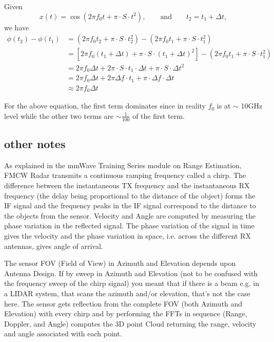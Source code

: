 \documentclass[11pt, oneside]{article}   	%
\begin{document}
Given
$$x(t) = \cos(2\pi f_0 t+ \pi \cdot S\cdot t^2), \qquad \text{and}\qquad t_2 = t_1 + \Delta t,$$
we have
\begin{align*}
\phi(t_2) - \phi(t_1) &= (2\pi f_0 t_2 + \pi\cdot S\cdot t_2^2) - (2\pi f_0 t_1 + \pi\cdot S\cdot t_1^2) \\
& = \left[2\pi f_0 (t_1+\Delta t) + \pi\cdot S\cdot (t_1 + \Delta t)^2\right] - (2\pi f_0 t_1 + \pi\cdot S\cdot t_1^2) \\
& = 2\pi f_0 \Delta t + 2\pi\cdot S\cdot t_1 \cdot \Delta t + \pi \cdot S\cdot \Delta t^2\\
& = 2\pi f_0 \Delta t + 2\pi \Delta f \cdot t_1 + \pi \cdot \Delta f \cdot \Delta t \\
& \approx 2\pi f_0 \Delta t
\end{align*}

For the above equation, the first term dominates since in reality $f_0$ is at $\sim$ 10GHz level while the other two terms are $\sim \frac{1}{100}$ of the first term. 

\subsection{other notes}

As explained in the mmWave Training Series module on Range Estimation, FMCW Radar transmits a continuous ramping frequency called a chirp. The difference between the instantaneous TX frequency and the instantaneous RX frequency (the delay being proportional to the distance of the object) forms the IF signal and the frequency peaks in the IF signal correspond to the distance to the objects from the sensor. Velocity and Angle are computed by measuring the phase variation in the reflected signal. The phase variation of the signal in time gives the velocity and the phase variation in space, i.e. across the different RX antennas, gives angle of arrival.

The sensor FOV (Field of View) in Azimuth and Elevation depends upon Antenna Design. If by sweep in Azimuth and Elevation (not to be confused with the frequency sweep of the chirp signal) you meant that if there is a beam e.g. in a LIDAR system, that scans the azimuth and/or elevation, that's not the case here. The sensor gets reflection from the complete FOV (both Azimuth and Elevation) with every chirp and by performing the FFTs in sequence (Range, Doppler, and Angle) computes the 3D point Cloud returning the range, velocity and angle associated with each point.
\end{document}
